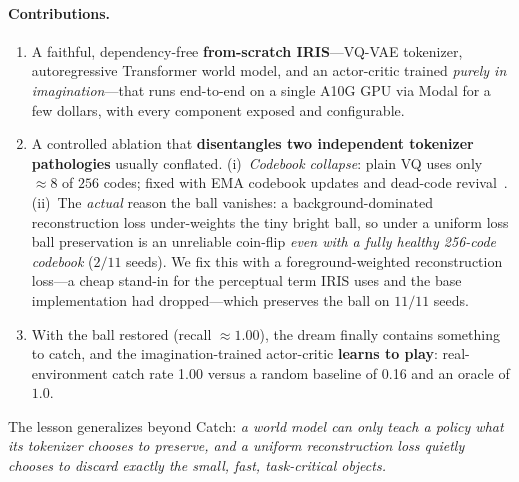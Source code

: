 \documentclass[11pt]{article}
\newcommand{\activeAfter}{256}
\newcommand{\nseeds}{11}
\newcommand{\keptEMA}{2}
\newcommand{\keptFG}{11}
\newcommand{\ballFG}{1.00}           %
\newcommand{\activePlain}{8}         %
\newcommand{\catchRate}{1.00}
\newcommand{\randCatch}{0.16}
\begin{document}
\paragraph{Contributions.}
\begin{enumerate}[leftmargin=1.4em,itemsep=1pt,topsep=2pt]
\item A faithful, dependency-free \textbf{from-scratch IRIS}---VQ-VAE tokenizer,
  autoregressive Transformer world model, and an actor-critic trained
  \emph{purely in imagination}---that runs end-to-end on a single A10G GPU via
  Modal for a few dollars, with every component exposed and configurable.
\item A controlled ablation that \textbf{disentangles two independent tokenizer
  pathologies} usually conflated. (i)~\emph{Codebook collapse}: plain VQ uses
  only $\approx\!\activePlain$ of $256$ codes; fixed with EMA codebook updates
  and dead-code revival~\cite{vqvae2,jukebox}. (ii)~The \emph{actual} reason the
  ball vanishes: a background-dominated reconstruction loss under-weights the
  tiny bright ball, so under a uniform loss ball preservation is an unreliable
  coin-flip \emph{even with a fully healthy \activeAfter-code codebook}
  ($\keptEMA/\nseeds$ seeds). We fix this with a foreground-weighted
  reconstruction loss---a cheap stand-in for the perceptual term IRIS uses and
  the base implementation had dropped---which preserves the ball on
  $\keptFG/\nseeds$ seeds.
\item With the ball restored (recall $\approx\!\ballFG$), the dream finally
  contains something to catch, and the imagination-trained actor-critic
  \textbf{learns to play}: real-environment catch rate \catchRate{} versus a
  random baseline of \randCatch{} and an oracle of $1.0$.
\end{enumerate}

The lesson generalizes beyond Catch: \emph{a world model can only teach a policy
what its tokenizer chooses to preserve, and a uniform reconstruction loss
quietly chooses to discard exactly the small, fast, task-critical objects.}

\end{document}
